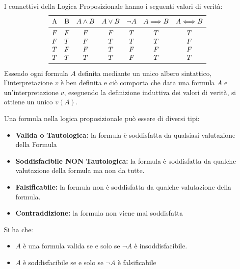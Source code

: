 \documentclass[a4paper,12pt, oneside]{book}
\begin{document}
I connettivi della Logica Proposizionale hanno i seguenti valori di verità:
\[
  \begin{array}{ccccccc}
    \toprule
    \text{A} & \text{B} & A \land B & A \lor B & \neg A & A \simplies B & A
                                                                          \siff
                                                                          B \\
    \midrule
    F & F & F & F & T & T & T \\
    F & T & F & T & T & T & F \\
    T & F & F & T & F & F & F \\
    T & T & T & T & F & T & T \\
    \bottomrule
  \end{array}
\]
Essendo ogni formula $A$ definita mediante un unico albero sintattico,
l'interpretazione $v$ 
è ben definita e ciò comporta che data una formula $A$ e un'interpretazione
$v$, 
eseguendo la definizione induttiva dei valori di verità, si ottiene un unico
$v(A)$. 

\begin{definizione}
  Una formula nella logica proposizionale può essere di diversi tipi:
  \begin{itemize}
    \item \textbf{Valida o Tautologica:} la formula è soddisfatta da qualsiasi
    valutazione della Formula 
    \item \textbf{Soddisfacibile NON Tautologica:} la formula è soddisfatta da
    qualche valutazione 
    della formula ma non da tutte.
    \item \textbf{Falsificabile:} la formula non è soddisfatta da qualche
    valutazione della formula. 
    \item \textbf{Contraddizione:} la formula non viene mai soddisfatta
  \end{itemize}
\end{definizione}

\begin{teorema}
  Si ha che:
  \begin{itemize}
    \item $A$ è una formula valida se e solo se $\neg A$ è insoddisfacibile.
    \item $A$ è soddisfacibile se e solo se $\neg A$ è falsificabile
  \end{itemize}
\end{teorema}
\end{document}
